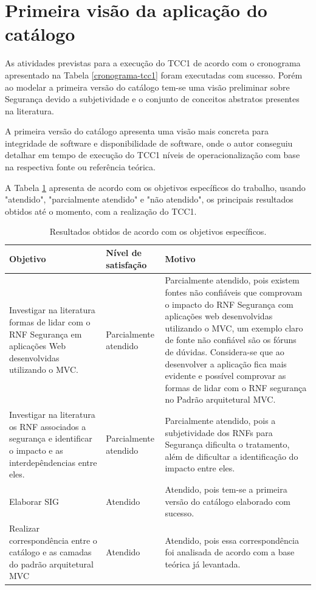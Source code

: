 \section{Primeira visão da aplicação do catálogo}
\label{sec: aplicacaoDoCatalogo}
As atividades previstas para a execução do TCC1 de acordo com o cronograma apresentado na Tabela \ref{cronograma-tcc1} foram executadas com sucesso. Porém ao modelar a primeira versão do catálogo tem-se uma visão preliminar sobre Segurança devido a subjetividade e o conjunto de conceitos abstratos presentes na literatura.

A primeira versão do catálogo apresenta uma visão mais concreta para integridade de software e disponibilidade de software, onde o autor conseguiu detalhar em tempo de execução do TCC1 níveis de operacionalização com base na respectiva fonte ou referência teórica.

A Tabela \ref{resultadosObtidos} apresenta de acordo com os objetivos específicos do trabalho, usando "atendido", "parcialmente atendido" e "não atendido", os principais resultados obtidos até o momento, com a realização do TCC1.

\begin{table}[h!]
	\centering
	\caption{Resultados obtidos de acordo com os objetivos específicos.}
	\label{resultadosObtidos}
	\tiny
	\begin{tabular}{@{}p{6cm}p{3cm}p{6cm}@{}}
		\toprule
		\textbf{Objetivo} & \textbf{Nível de satisfação} & \textbf{Motivo} \\ \midrule
		Investigar na literatura formas de lidar com o RNF Segurança  em aplicações Web desenvolvidas utilizando o MVC. & Parcialmente atendido & Parcialmente atendido, pois existem fontes não confiáveis que comprovam o impacto do RNF Segurança com aplicações web desenvolvidas utilizando o MVC, um exemplo claro de fonte não confiável são os fóruns de dúvidas. Considera-se que ao desenvolver a aplicação fica mais evidente e possível comprovar as formas de lidar com o RNF segurança no Padrão arquitetural MVC. \\
		\rowcolor[HTML]{C0C0C0} 
		Investigar na literatura os RNF associados a segurança e identificar o impacto e as interdepêndencias entre eles. & Parcialmente atendido & Parcialmente atendido, pois a subjetividade dos RNFs para Segurança dificulta o tratamento, além de dificultar a identificação do impacto entre eles. \\
		Elaborar SIG & Atendido & Atendido, pois tem-se a primeira versão do catálogo elaborado com sucesso. \\
		\rowcolor[HTML]{C0C0C0} 
		Realizar correspondência entre o catálogo e as camadas do padrão arquitetural MVC & Atendido & Atendido, pois essa correspondência foi analisada de acordo com a base teórica já levantada. \\ \bottomrule
	\end{tabular}
\end{table}


